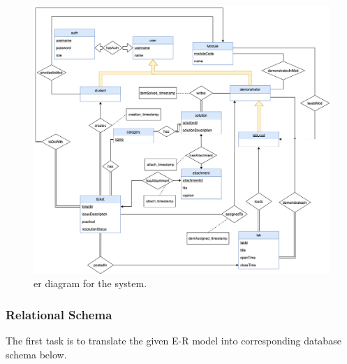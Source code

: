 \begin{figure}[H]
    \centering
    \includegraphics[width=\textwidth]{7design/images/ER.png}
    \caption{\gls{er} diagram for the system.}
    \label{fig:ER}
\end{figure}

\subsubsection{Relational Schema}
The first task is to translate the given E-R model into corresponding database schema below.\\

